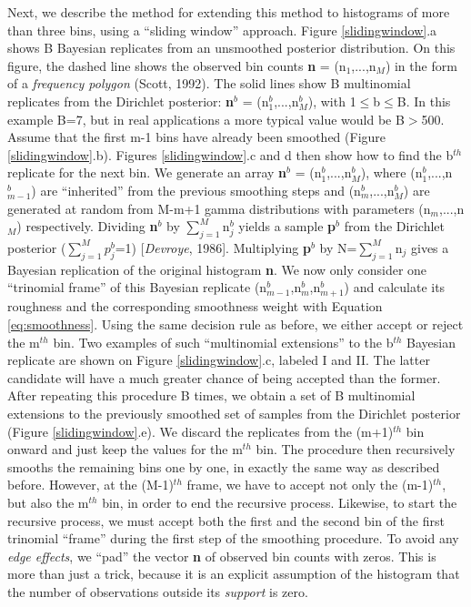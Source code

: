 \documentclass{article}
\begin{document}
Next, we describe  the method for extending this  method to histograms
of more than three bins,  using a ``sliding window'' approach.  Figure
\ref{slidingwindow}.a shows  B Bayesian replicates  from an unsmoothed
posterior  distribution. On  this figure,  the dashed  line  shows the
observed bin counts {\bf n} =  (n$_1$,...,n$_M$) in the form of a {\it
frequency polygon} (Scott, 1992).   The solid lines show B multinomial
replicates   from   the   Dirichlet   posterior:   {\bf   n}$^{b}$   =
(n$^{b}_1$,...,n$^{b}_{M}$),  with 1$\leq$b$\leq$B.   In  this example
B=7,  but  in  real  applications   a  more  typical  value  would  be
B$>$500. Assume  that the  first m-1 bins  have already  been smoothed
(Figure  \ref{slidingwindow}.b).  Figures \ref{slidingwindow}.c  and d
then show  how to find  the b$^{th}$ replicate  for the next  bin.  We
generate an array {\bf n}$^{b}$ = (n$^{b}_{1}$,...,n$^{b}_{M}$), where
(n$^{b}_{1}$,...,n$^{b}_{m-1}$)  are ``inherited''  from  the previous
smoothing  steps and  (n$^{b}_{m}$,...,n$^{b}_{M}$)  are generated  at
random    from    M-m+1    gamma   distributions    with    parameters
(n$_{m}$,...,n$_{M}$)   respectively.   Dividing   {\bf   n}$^{b}$  by
$\sum_{j=1}^{M}$n$_{j}^{b}$  yields a  sample {\bf  p}$^{b}$  from the
Dirichlet  posterior   ($\sum_{j=1}^{M}p_{j}^{b}$=1)  [{\it  Devroye},
1986].  Multiplying {\bf p}$^{b}$ by N=$\sum_{j=1}^{M}$n$_{j}$ gives a
Bayesian replication of  the original histogram {\bf n}.   We now only
consider   one  ``trinomial   frame''  of   this   Bayesian  replicate
(n$^{b}_{m-1}$,n$^{b}_{m}$,n$^{b}_{m+1}$) and  calculate its roughness
and    the    corresponding    smoothness   weight    with    Equation
\ref{eq:smoothness}.   Using  the same  decision  rule  as before,  we
either  accept or  reject  the  m$^{th}$ bin.   Two  examples of  such
``multinomial  extensions''  to the  b$^{th}$  Bayesian replicate  are
shown on  Figure \ref{slidingwindow}.c, labeled I and  II.  The latter
candidate will have  a much greater chance of  being accepted than the
former.\\

After  repeating  this  procedure  B  times,  we obtain  a  set  of  B
multinomial extensions to the  previously smoothed set of samples from
the  Dirichlet posterior  (Figure \ref{slidingwindow}.e).   We discard
the  replicates from  the (m+1)$^{th}$  bin onward  and just  keep the
values for  the m$^{th}$ bin.  The procedure then  recursively smooths
the remaining  bins one by one,  in exactly the same  way as described
before. However, at the (M-1)$^{th}$ frame, we have to accept not only
the  (m-1)$^{th}$, but  also the  m$^{th}$ bin,  in order  to  end the
recursive process.  Likewise, to  start the recursive process, we must
accept  both the  first  and the  second  bin of  the first  trinomial
``frame'' during the first step  of the smoothing procedure.  To avoid
any {\it edge effects}, we ``pad''  the vector {\bf n} of observed bin
counts with zeros.   This is more than just a trick,  because it is an
explicit assumption  of the histogram that the  number of observations
outside its {\it support} is zero.\\
\end{document}
